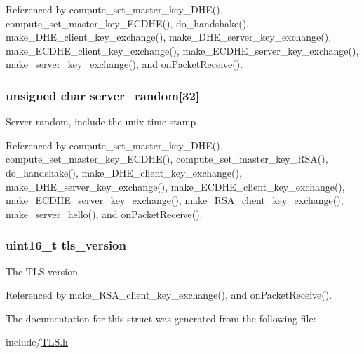 Referenced by compute\+\_\+set\+\_\+master\+\_\+key\+\_\+\+D\+H\+E(), compute\+\_\+set\+\_\+master\+\_\+key\+\_\+\+E\+C\+D\+H\+E(), do\+\_\+handshake(), make\+\_\+\+D\+H\+E\+\_\+client\+\_\+key\+\_\+exchange(), make\+\_\+\+D\+H\+E\+\_\+server\+\_\+key\+\_\+exchange(), make\+\_\+\+E\+C\+D\+H\+E\+\_\+client\+\_\+key\+\_\+exchange(), make\+\_\+\+E\+C\+D\+H\+E\+\_\+server\+\_\+key\+\_\+exchange(), make\+\_\+server\+\_\+key\+\_\+exchange(), and on\+Packet\+Receive().

\subsubsection[{\texorpdfstring{server\+\_\+random}{server_random}}]{\setlength{\rightskip}{0pt plus 5cm}unsigned char server\+\_\+random\mbox{[}32\mbox{]}}\hypertarget{struct_t_l_s__parameters__t_a9159f146fbc286a8b55f4aa83396ae2f}{}\label{struct_t_l_s__parameters__t_a9159f146fbc286a8b55f4aa83396ae2f}
Server random, include the unix time stamp 

Referenced by compute\+\_\+set\+\_\+master\+\_\+key\+\_\+\+D\+H\+E(), compute\+\_\+set\+\_\+master\+\_\+key\+\_\+\+E\+C\+D\+H\+E(), compute\+\_\+set\+\_\+master\+\_\+key\+\_\+\+R\+S\+A(), do\+\_\+handshake(), make\+\_\+\+D\+H\+E\+\_\+client\+\_\+key\+\_\+exchange(), make\+\_\+\+D\+H\+E\+\_\+server\+\_\+key\+\_\+exchange(), make\+\_\+\+E\+C\+D\+H\+E\+\_\+client\+\_\+key\+\_\+exchange(), make\+\_\+\+E\+C\+D\+H\+E\+\_\+server\+\_\+key\+\_\+exchange(), make\+\_\+\+R\+S\+A\+\_\+client\+\_\+key\+\_\+exchange(), make\+\_\+server\+\_\+hello(), and on\+Packet\+Receive().

\subsubsection[{\texorpdfstring{tls\+\_\+version}{tls_version}}]{\setlength{\rightskip}{0pt plus 5cm}uint16\+\_\+t tls\+\_\+version}\hypertarget{struct_t_l_s__parameters__t_a8fd63193690a09b75e0aaf9b971ed3df}{}\label{struct_t_l_s__parameters__t_a8fd63193690a09b75e0aaf9b971ed3df}
The T\+LS version 

Referenced by make\+\_\+\+R\+S\+A\+\_\+client\+\_\+key\+\_\+exchange(), and on\+Packet\+Receive().



The documentation for this struct was generated from the following file\+:\begin{DoxyCompactItemize}
\item 
include/\hyperlink{_t_l_s_8h}{T\+L\+S.\+h}\end{DoxyCompactItemize}
